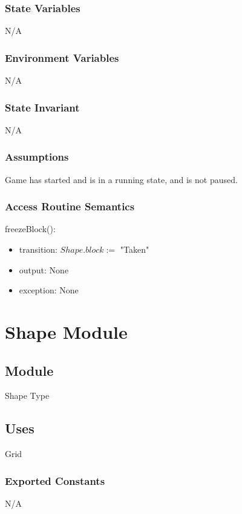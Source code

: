 \documentclass[12pt]{article}
\begin{document}
\subsubsection* {State Variables}

N/A

\subsubsection* {Environment Variables}

N/A

\subsubsection* {State Invariant}

N/A

\subsubsection* {Assumptions}
Game has started and is in a running state, and is not paused.
\subsubsection* {Access Routine Semantics}

\noindent freezeBlock():
\begin{itemize}
\item transition: $Shape.block := $ "Taken"
\item output: None
\item exception: None
\end{itemize}

\newpage

\section* {Shape Module}

\subsection*{Module}

Shape Type

\subsection* {Uses}

Grid


\subsubsection*{Exported Constants}
N/A
\end{document}
